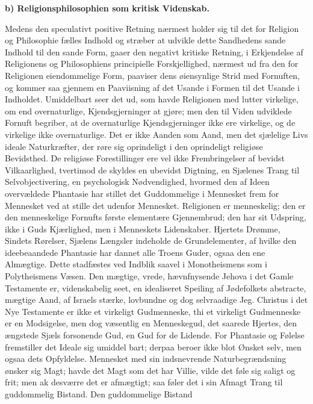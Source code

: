 \documentclass[12pt]{book}
\newcommand{\runhead}[1]{%
  \medskip\begin{center}{\bfseries #1}\end{center}\medskip}
\begin{document}
\runhead{b) Religionsphilosophien som kritisk Videnskab.}

Medens den speculativt positive Retning nærmest holder sig til det
for Religion og Philosophie fælles Indhold og stræber at udvikle
dette Sandhedens sande
Indhold til den sande Form, gaaer den negativt kritiske Retning, i
Erkjendelse af Religionens og Philosophiens principielle
Forskjellighed, nærmest ud fra den for Religionen eiendommelige
Form, paaviser dens øiensynlige Strid med Fornuften, og kommer saa
gjennem en Paaviisning af det Usande i Formen til det Usande i
Indholdet. Umiddelbart seer det ud, som havde Religionen med lutter
virkelige, om end overnaturlige, Kjendsgjerninger at gjøre; men den
til Viden udviklede Fornuft begriber, at de overnaturlige
Kjendsgjerninger ikke ere virkelige, og de virkelige ikke
overnaturlige. Det er ikke Aanden som Aand, men det sjælelige Livs
ideale Naturkræfter, der røre sig oprindeligt i den oprindeligt
religiøse Bevidsthed. De religiøse Forestillinger ere vel ikke
Frembringelser af bevidst Vilkaarlighed, tvertimod de skyldes en
ubevidst Digtning, en Sjælenes Trang til Selvobjectivering, en
psychologisk Nødvendighed, hvormed den af Ideen overvældede
Phantasie har stillet det Guddommelige i Mennesket frem for
Mennesket ved at stille det udenfor Mennesket. Religionen er
menneskelig; den er den menneskelige Fornufts første elementære
Gjennembrud; den har sit Udspring, ikke i Guds Kjærlighed, men i
Menneskets Lidenskaber. Hjertets Drømme, Sindets Rørelser, Sjælens
Længsler indeholde de Grundelementer, af hvilke den ideebeaandede
Phantasie har dannet alle Troens Guder, ogsaa den ene Almægtige.
Dette stadfæstes ved Indblik saavel i Mono\-theismens som i
Polytheismens Væsen. Den mægtige, vrede, hævnfnysende Jehova i det
Gamle Testamente er, videnskabelig seet, en idealiseret Speiling af
Jødefolkets abstracte, mægtige Aand, af Israels stærke, lovbundne og
dog selvraadige Jeg. Christus i det Nye Testamente er ikke et
virkeligt Gudmenneske, thi et virkeligt Gudmenneske er en
Modsigelse, men dog væsentlig en Menneskegud, det saarede Hjertes,
den ængstede Sjæls forsonende Gud, en Gud for de Lidende. For
Phantasie og Følelse fremstiller det Ideale sig umiddel\-
bart; derpaa beroer ikke blot Ønsket selv, men ogsaa dets
Opfyldelse. Mennesket med sin indsnevrende Naturbegrændsning ønsker
sig Magt; havde det Magt som det har Villie, vilde det føle sig
saligt og frit; men ak desværre det er afmægtigt; saa føler det i
sin Afmagt Trang til guddommelig Bistand. Den guddommelige Bistand
\end{document}
